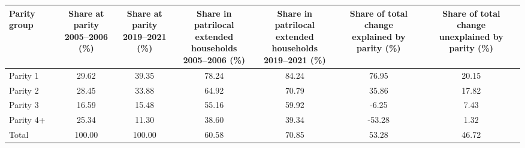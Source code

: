 \begin{tabular}{lcccccc}
\toprule
Parity group & \makecell{Share at parity\\2005--2006 (\%)} & \makecell{Share at parity\\2019--2021 (\%)} & \makecell{Share in patrilocal\\extended households\\2005--2006 (\%)} & \makecell{Share in patrilocal\\extended households\\2019--2021 (\%)} & \makecell{Share of total change\\explained by parity (\%)} & \makecell{Share of total change\\unexplained by parity (\%)} \\
\midrule
Parity 1&29.62&39.35&78.24&84.24&76.95&20.15\\
Parity 2&28.45&33.88&64.92&70.79&35.86&17.82\\
Parity 3&16.59&15.48&55.16&59.92&-6.25&7.43\\
Parity 4+&25.34&11.30&38.60&39.34&-53.28&1.32\\
Total&100.00&100.00&60.58&70.85&53.28&46.72\\
\bottomrule
\end{tabular}
